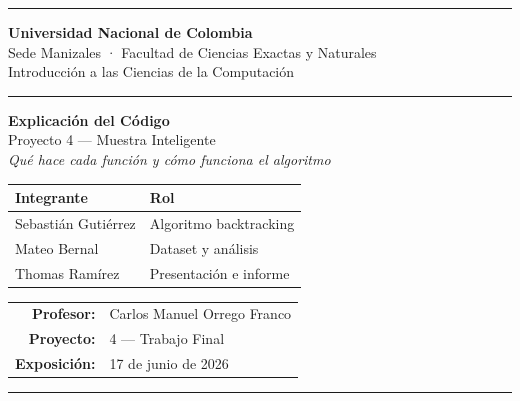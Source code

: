 \documentclass[11pt, a4paper]{article}
\begin{document}

\begin{titlepage}
  \centering
  \vspace*{0.8cm}
  {\color{unalverde}\rule{\linewidth}{2.5pt}}
  \vspace{0.5cm}

  {\LARGE\bfseries\color{unalverde} Universidad Nacional de Colombia}\\[0.2cm]
  {\large Sede Manizales · Facultad de Ciencias Exactas y Naturales}\\[0.15cm]
  {\normalsize Introducción a las Ciencias de la Computación}

  \vspace{0.8cm}
  {\color{unalverde}\rule{\linewidth}{1pt}}
  \vspace{1.2cm}

  {\Huge\bfseries Explicación del Código}\\[0.4cm]
  {\Large Proyecto 4 — Muestra Inteligente}\\[0.3cm]
  {\large\itshape Qué hace cada función y cómo funciona el algoritmo}

  \vspace{1.6cm}

  \begin{tabular}{ll}
    \toprule
    \textbf{Integrante}    & \textbf{Rol} \\
    \midrule
    Sebastián Gutiérrez    & Algoritmo backtracking \\
    Mateo Bernal           & Dataset y análisis \\
    Thomas Ramírez         & Presentación e informe \\
    \bottomrule
  \end{tabular}

  \vspace{1.4cm}

  \begin{tabular}{rl}
    \textbf{Profesor:}   & Carlos Manuel Orrego Franco \\
    \textbf{Proyecto:}   & 4 — Trabajo Final \\
    \textbf{Exposición:} & 17 de junio de 2026 \\
  \end{tabular}

  \vspace{1cm}
  {\color{unalverde}\rule{\linewidth}{2.5pt}}
\end{titlepage}
\end{document}
